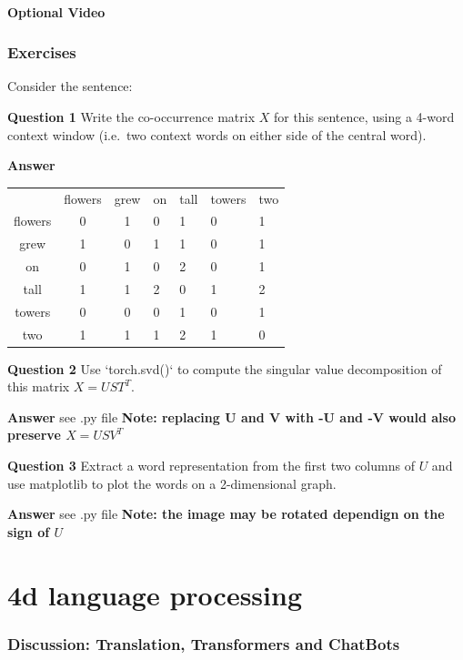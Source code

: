 \documentclass[11pt]{article}
\begin{document}
\subsection{Optional Video}\label{subsec:optional-video4}

\section{Exercises}\label{sec:exercises}
Consider the sentence:

\textbf{Question 1}
Write the co-occurrence matrix $X$ for this sentence, using a 4-word context
window (i.e.\ two context words on either side of the central word).

\textbf{Answer}
\begin{center}
\begin{tabular}{ |c|c|c| }
 \hline
  & flowers & grew & on & tall & towers & two \\
 flowers & 0 & 1 & 0 & 1 & 0 & 1 \\
 grew & 1 & 0 & 1 & 1 & 0 & 1 \\
 on & 0 & 1 & 0 & 2 & 0 & 1 \\
 tall & 1 & 1 & 2 & 0 & 1 & 2 \\
 towers & 0 & 0 & 0 & 1 & 0 & 1 \\
 two & 1 & 1 & 1 & 2 & 1 & 0 \\
 \hline
\end{tabular}
\end{center}

\textbf{Question 2}
Use `torch.svd()` to compute the singular value decomposition of this matrix $X = UST^T$.

\textbf{Answer}
see .py file
\textbf{Note: replacing U and V with -U and -V would also preserve $X=USV^T$}

\textbf{Question 3}
Extract a word representation from the first two columns of $U$ and use matplotlib to plot the words on a 2-dimensional graph.

\textbf{Answer}
see .py file
\textbf{Note: the image may be rotated dependign on the sign of $U$}
\part{4d language processing}\label{part:4d-language-processing}

\section{Discussion: Translation, Transformers and ChatBots}\label{sec:discussion:-translation-transformers-and-chatbots}
\end{document}
